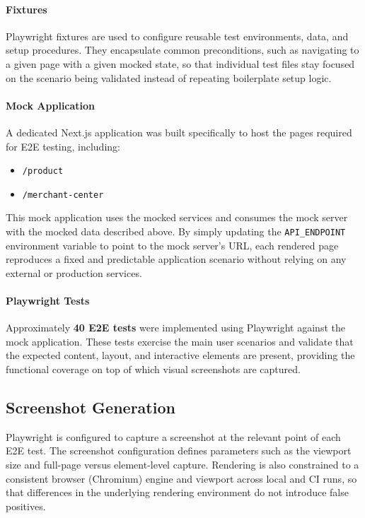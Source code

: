 \paragraph{Fixtures} Playwright fixtures are used to configure reusable test environments, data, and setup procedures. They encapsulate common preconditions, such as navigating to a given page with a given mocked state, so that individual test files stay focused on the scenario being validated instead of repeating boilerplate setup logic.
 
\paragraph{Mock Application} A dedicated Next.js application was built specifically to host the pages required for \ac{E2E} testing, including:
 
\begin{itemize}
    \item \texttt{/product}
    \item \texttt{/merchant-center}
\end{itemize}
 
This mock application uses the mocked services and consumes the mock server with the mocked data described above. By simply updating the \texttt{API\_ENDPOINT} environment variable to point to the mock server's URL, each rendered page reproduces a fixed and predictable application scenario without relying on any external or production services.
 
\paragraph{Playwright Tests} Approximately \textbf{40 \ac{E2E} tests} were implemented using Playwright against the mock application. These tests exercise the main user scenarios and validate that the expected content, layout, and interactive elements are present, providing the functional coverage on top of which visual screenshots are captured.

\subsection{Screenshot Generation}

Playwright is configured to capture a screenshot at the relevant point of each \ac{E2E} test. The screenshot configuration defines parameters such as the viewport size and full-page versus element-level capture. Rendering is also constrained to a consistent browser (Chromium) engine and viewport across local and \ac{CI} runs, so that differences in the underlying rendering environment do not introduce false positives.

